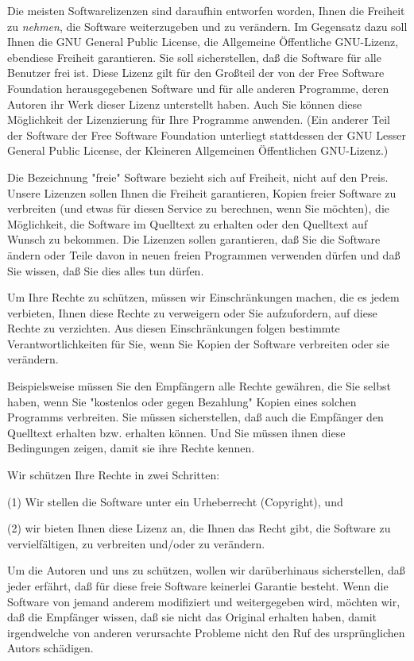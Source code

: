 {\small

Die meisten Softwarelizenzen sind daraufhin entworfen worden, Ihnen die Freiheit zu \textit{nehmen}, die Software weiterzugeben und zu verändern. Im Gegensatz dazu soll Ihnen die GNU General Public License, die Allgemeine Öffentliche GNU-Lizenz, ebendiese Freiheit garantieren. Sie soll sicherstellen, daß die Software für alle Benutzer frei ist. Diese Lizenz gilt für den Großteil der von der Free Software Foundation herausgegebenen Software und für alle anderen Programme, deren Autoren ihr Werk dieser Lizenz unterstellt haben. Auch Sie können diese Möglichkeit der Lizenzierung für Ihre Programme anwenden. (Ein anderer Teil der Software der Free Software Foundation unterliegt stattdessen der GNU Lesser General Public License, der Kleineren Allgemeinen Öffentlichen GNU-Lizenz.)

Die Bezeichnung "freie" Software bezieht sich auf Freiheit, nicht auf den Preis. Unsere Lizenzen sollen Ihnen die Freiheit garantieren, Kopien freier Software zu verbreiten (und etwas für diesen Service zu berechnen, wenn Sie möchten), die Möglichkeit, die Software im Quelltext zu erhalten oder den Quelltext auf Wunsch zu bekommen. Die Lizenzen sollen garantieren, daß Sie die Software ändern oder Teile davon in neuen freien Programmen verwenden dürfen und daß Sie wissen, daß Sie dies alles tun dürfen.

Um Ihre Rechte zu schützen, müssen wir Einschränkungen machen, die es jedem verbieten, Ihnen diese Rechte zu verweigern oder Sie aufzufordern, auf diese Rechte zu verzichten. Aus diesen Einschränkungen folgen bestimmte Verantwortlichkeiten für Sie, wenn Sie Kopien der Software verbreiten oder sie verändern.

Beispielsweise müssen Sie den Empfängern alle Rechte gewähren, die Sie selbst haben, wenn Sie "kostenlos oder gegen Bezahlung" Kopien eines solchen Programms verbreiten. Sie müssen sicherstellen, daß auch die Empfänger den Quelltext erhalten bzw. erhalten können. Und Sie müssen ihnen diese Bedingungen zeigen, damit sie ihre Rechte kennen.

Wir schützen Ihre Rechte in zwei Schritten:

(1) Wir stellen die Software unter ein Urheberrecht (Copyright), und

(2) wir bieten Ihnen diese Lizenz an, die Ihnen das Recht gibt, die Software zu vervielfältigen, zu verbreiten und/oder zu verändern.

Um die Autoren und uns zu schützen, wollen wir darüberhinaus sicherstellen, daß jeder erfährt, daß für diese freie Software keinerlei Garantie besteht. Wenn die Software von jemand anderem modifiziert und weitergegeben wird, möchten wir, daß die Empfänger wissen, daß sie nicht das Original erhalten haben, damit irgendwelche von anderen verursachte Probleme nicht den Ruf des ursprünglichen Autors schädigen.

}
